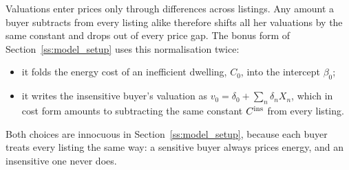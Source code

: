 Valuations enter prices only through differences across listings. Any amount a buyer subtracts from every listing alike therefore shifts all her valuations by the same constant and drops out of every price gap. The bonus form of Section~\ref{ss:model_setup} uses this normalisation twice:
\begin{itemize}
    \item it folds the energy cost of an inefficient dwelling, $C_0$, into the intercept $\beta_0$;
    \item it writes the insensitive buyer's valuation as $v_0=\delta_0+\sum_n\delta_nX_n$, which in cost form amounts to subtracting the same constant $C^{\rm ins}$ from every listing.
\end{itemize}
Both choices are innocuous in Section~\ref{ss:model_setup}, because each buyer treats every listing the same way: a sensitive buyer always prices energy, and an insensitive one never does.
